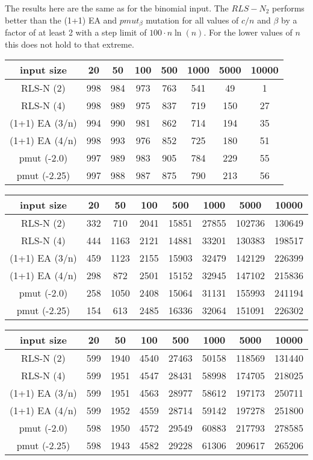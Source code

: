 The results here are the same as for the binomial input. The $RLS-N_2$ performs better than the (1+1) EA and $pmut_\beta$ mutation for all values of $c/n$ and $\beta$ by a factor of at least 2 with a step limit of $100 \cdot n \ln(n)$. For the lower values of $n$ this does not hold to that extreme.

\begin{tabular}[h]{cccccccc}
      input size     & 20  & 50  & 100 & 500 & 1000 & 5000 & 10000 \\\hline
      RLS-N (2)      & 998 & 984 & 973 & 763 & 541  & 49   & 1     \\
      RLS-N (4)      & 998 & 989 & 975 & 837 & 719  & 150  & 27    \\
      (1+1) EA (3/n) & 994 & 990 & 981 & 862 & 714  & 194  & 35    \\
      (1+1) EA (4/n) & 998 & 993 & 976 & 852 & 725  & 180  & 51    \\
      pmut (-2.0)    & 997 & 989 & 983 & 905 & 784  & 229  & 55    \\
      pmut (-2.25)   & 997 & 988 & 987 & 875 & 790  & 213  & 56    \\
\end{tabular}

\begin{tabular}[h]{cccccccc}
      input size     & 20  & 50   & 100  & 500   & 1000  & 5000   & 10000  \\\hline
      RLS-N (2)      & 332 & 710  & 2041 & 15851 & 27855 & 102736 & 130649 \\
      RLS-N (4)      & 444 & 1163 & 2121 & 14881 & 33201 & 130383 & 198517 \\
      (1+1) EA (3/n) & 459 & 1123 & 2155 & 15903 & 32479 & 142129 & 226399 \\
      (1+1) EA (4/n) & 298 & 872  & 2501 & 15152 & 32945 & 147102 & 215836 \\
      pmut (-2.0)    & 258 & 1050 & 2408 & 15064 & 31131 & 155993 & 241194 \\
      pmut (-2.25)   & 154 & 613  & 2485 & 16336 & 32064 & 151091 & 226302 \\
\end{tabular}

\begin{tabular}[h]{cccccccc}
      input size     & 20  & 50   & 100  & 500   & 1000  & 5000   & 10000  \\\hline
      RLS-N (2)      & 599 & 1940 & 4540 & 27463 & 50158 & 118569 & 131440 \\
      RLS-N (4)      & 599 & 1951 & 4547 & 28431 & 58998 & 174705 & 218025 \\
      (1+1) EA (3/n) & 599 & 1951 & 4563 & 28977 & 58612 & 197173 & 250711 \\
      (1+1) EA (4/n) & 599 & 1952 & 4559 & 28714 & 59142 & 197278 & 251800 \\
      pmut (-2.0)    & 598 & 1950 & 4572 & 29549 & 60883 & 217793 & 278585 \\
      pmut (-2.25)   & 598 & 1943 & 4582 & 29228 & 61306 & 209617 & 265206 \\
\end{tabular}